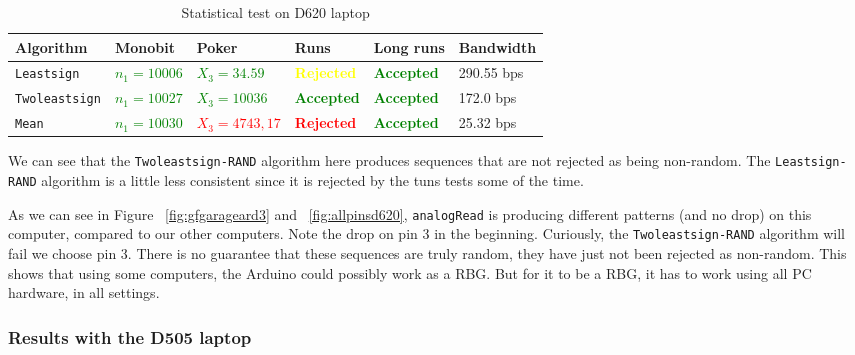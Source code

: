 \documentclass[a4paper]{article}           %
\begin{document}
  \begin{table}[H]
    \begin{center}
      \begin{tabular}{| l | p{1.8cm} | p{2.2cm} | l | l | l |}
        \hline
        Algorithm & Monobit & Poker & Runs & Long runs & Bandwidth\\
        \hline
        \hline
        \texttt{Leastsign} & \textcolor{green}{$n_1 = 10 006$}
        & \textcolor{green}{$X_3 = 34.59$}
        & \textcolor{yellow}{\textbf{Rejected}}
        & \textcolor{green}{\textbf{Accepted}}
        & 290.55 bps \\

        \texttt{Twoleastsign} & \textcolor{green}{$n_1 = 10027$}
        & \textcolor{green}{$X_3 = 10036$}
        & \textcolor{green}{\textbf{Accepted}}
        & \textcolor{green}{\textbf{Accepted}}
        & 172.0 bps \\

        \texttt{Mean} & \textcolor{green}{$n_1 = 10030$}
        & \textcolor{red}{$X_3 = 4743,17$}
        & \textcolor{red}{\textbf{Rejected}}
        & \textcolor{green}{\textbf{Accepted}}
        & 25.32 bps \\

        \hline
      \end{tabular}
    \end{center}
    \label{tab:res1}
    \caption{Statistical test on D620 laptop}
  \end{table}

We can see that the \texttt{Twoleastsign-RAND} algorithm here produces sequences that are not rejected as being non-random. The \texttt{Leastsign-RAND} algorithm is a little less consistent since it is rejected by the tuns tests some of the time.

 As we can see in Figure ~\ref{fig:gfgarageard3} and ~\ref{fig:allpinsd620}, \texttt{analogRead} is producing different patterns (and no drop) on this computer, compared to our other computers. Note the drop on pin 3 in the beginning. Curiously, the \texttt{Twoleastsign-RAND} algorithm will fail we choose pin 3. There is no guarantee that these sequences are truly random, they have just not been rejected as non-random. This shows that using some computers, the Arduino could possibly work as a RBG. But for it to be a RBG, it has to work using all PC hardware, in all settings. 

\subsubsection{Results with the D505 laptop}
\end{document}
